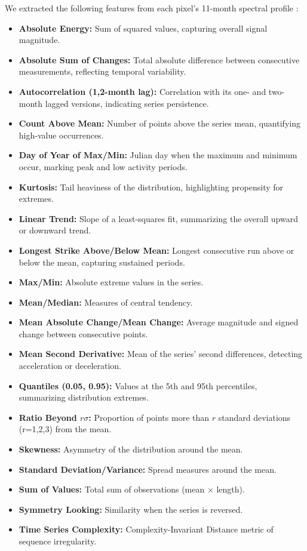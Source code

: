 \documentclass[pdflatex,sn-mathphys]{sn-jnl} %
\begin{document}
We extracted the following features from each pixel’s 11-month spectral profile \cite{mann2023}:
\begin{itemize}
  \item \textbf{Absolute Energy:} Sum of squared values, capturing overall signal magnitude.
  \item \textbf{Absolute Sum of Changes:} Total absolute difference between consecutive measurements, reflecting temporal variability.
  \item \textbf{Autocorrelation (1,2-month lag):} Correlation with its one- and two-month lagged versions, indicating series persistence.
  \item \textbf{Count Above Mean:} Number of points above the series mean, quantifying high-value occurrences.
  \item \textbf{Day of Year of Max/Min:} Julian day when the maximum and minimum occur, marking peak and low activity periods.
  \item \textbf{Kurtosis:} Tail heaviness of the distribution, highlighting propensity for extremes.
  \item \textbf{Linear Trend:} Slope of a least-squares fit, summarizing the overall upward or downward trend.
  \item \textbf{Longest Strike Above/Below Mean:} Longest consecutive run above or below the mean, capturing sustained periods.
  \item \textbf{Max/Min:} Absolute extreme values in the series.
  \item \textbf{Mean/Median:} Measures of central tendency.
  \item \textbf{Mean Absolute Change/Mean Change:} Average magnitude and signed change between consecutive points.
  \item \textbf{Mean Second Derivative:} Mean of the series’ second differences, detecting acceleration or deceleration.
  \item \textbf{Quantiles (0.05, 0.95):} Values at the 5th and 95th percentiles, summarizing distribution extremes.
  \item \textbf{Ratio Beyond \(r\sigma\):} Proportion of points more than \(r\) standard deviations (r=1,2,3) from the mean.
  \item \textbf{Skewness:} Asymmetry of the distribution around the mean.
  \item \textbf{Standard Deviation/Variance:} Spread measures around the mean.
  \item \textbf{Sum of Values:} Total sum of observations (mean × length).
  \item \textbf{Symmetry Looking:} Similarity when the series is reversed.
  \item \textbf{Time Series Complexity:} Complexity-Invariant Distance metric of sequence irregularity.
\end{itemize}
\end{document}
